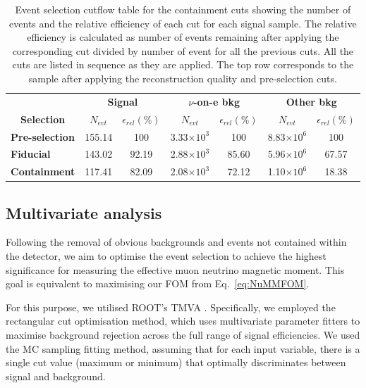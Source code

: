 \begin{table}[!hb]
\centering
\caption[Event selection cutflow table for the containment cuts]{Event selection cutflow table for the containment cuts showing the number of events and the relative efficiency of each cut for each signal sample. The relative efficiency is calculated as number of events remaining after applying the corresponding cut divided by number of event for all the previous cuts. All the cuts are listed in sequence as they are applied. The top row corresponds to the sample after applying the reconstruction quality and pre-selection cuts.}
\begin{tabular}{|l|cc|cc|cc|}\hline
\multicolumn{1}{|c|}{} & \multicolumn{2}{c|}{\textbf{Signal}} & \multicolumn{2}{c|}{\textbf{$\nu$-on-e bkg}} & \multicolumn{2}{c|}{\textbf{Other bkg}} \\
\multicolumn{1}{|c|}{\multirow{-2}{*}{\textbf{Selection}}} & \textbf{$N_{evt}$} & \textbf{$\epsilon_{rel}\left(\%\right)$} & \textbf{$N_{evt}$} & \textbf{$\epsilon_{rel}\left(\%\right)$}  & \textbf{$N_{evt}$} & \textbf{$\epsilon_{rel}\left(\%\right)$}\\\hline
\textbf{Pre-selection} & 155.14 & 100 & 3.33$\times 10^3$ & 100 & 8.83$\times 10^6$ & 100\\
\textbf{Fiducial} & 143.02 & 92.19 & 2.88$\times 10^3$ & 85.60 & 5.96$\times 10^6$ & 67.57\\
\textbf{Containment} & 117.41 & 82.09 & 2.08$\times 10^3$ & 72.12 & 1.10$\times 10^6$ & 18.38\\\hline
\end{tabular}
\label{tab:CutflowTableFiducialContainmnet}
\end{table}

\subsection{Multivariate analysis}\label{sec:NuMMEventSelTMVA}
Following the removal of obvious backgrounds and events not contained within the detector, we aim to optimise the event selection to achieve the highest significance for measuring the effective muon neutrino magnetic moment. This goal is equivalent to maximising our \gls{FOM} from Eq.~\ref{eq:NuMMFOM}.

For this purpose, we utilised ROOT's \cite{ROOT} \gls{TMVA} \cite{TMVA}. Specifically, we employed the rectangular cut optimisation method, which uses multivariate parameter fitters to maximise background rejection across the full range of signal efficiencies. We used the \gls{MC} sampling fitting method, assuming that for each input variable, there is a single cut value (maximum or minimum) that optimally discriminates between signal and background.

